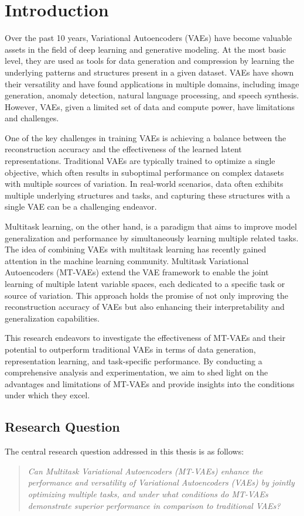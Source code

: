 \chapter{Introduction}

Over the past 10 years, Variational Autoencoders (VAEs) have become valuable assets in the field of deep learning and generative modeling. At the most basic level, they are used as tools for data generation and compression by learning the underlying patterns and structures present in a given dataset. VAEs have shown their versatility and have found applications in multiple domains, including image generation, anomaly detection, natural language processing, and speech synthesis. However, VAEs, given a limited set of data and compute power, have limitations and challenges.\cite{kingma2013autoencoding,Kingma_2019, vqvae, dalle}

One of the key challenges in training VAEs is achieving a balance between the reconstruction accuracy and the effectiveness of the learned latent representations. Traditional VAEs are typically trained to optimize a single objective, which often results in suboptimal performance on complex datasets with multiple sources of variation. In real-world scenarios, data often exhibits multiple underlying structures and tasks, and capturing these structures with a single VAE can be a challenging endeavor.

Multitask learning, on the other hand, is a paradigm that aims to improve model generalization and performance by simultaneously learning multiple related tasks. The idea of combining VAEs with multitask learning has recently gained attention in the machine learning community. Multitask Variational Autoencoders (MT-VAEs) extend the VAE framework to enable the joint learning of multiple latent variable spaces, each dedicated to a specific task or source of variation. This approach holds the promise of not only improving the reconstruction accuracy of VAEs but also enhancing their interpretability and generalization capabilities.

This research endeavors to investigate the effectiveness of MT-VAEs and their potential to outperform traditional VAEs in terms of data generation, representation learning, and task-specific performance. By conducting a comprehensive analysis and experimentation, we aim to shed light on the advantages and limitations of MT-VAEs and provide insights into the conditions under which they excel.

\section{Research Question}

The central research question addressed in this thesis is as follows:

\begin{quote}
\textit{Can Multitask Variational Autoencoders (MT-VAEs) enhance the performance and versatility of Variational Autoencoders (VAEs) by jointly optimizing multiple tasks, and under what conditions do MT-VAEs demonstrate superior performance in comparison to traditional VAEs?}
\end{quote}



